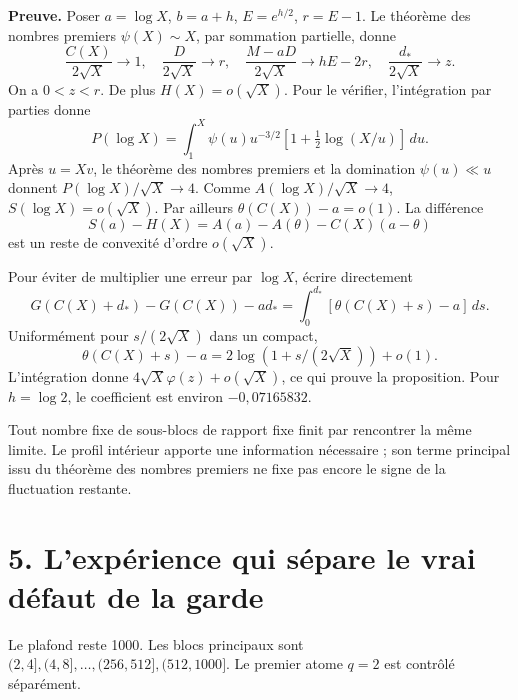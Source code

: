 \documentclass[
  11pt,
  a4paper,
]{article}
\begin{document}
\textbf{Preuve.} Poser \(a=\log X\), \(b=a+h\), \(E=e^{h/2}\),
\(r=E-1\). Le théorème des nombres premiers \(\psi(X)\sim X\), par
sommation partielle, donne \[
\frac{C(X)}{2\sqrt X}\to1,\quad
\frac{D}{2\sqrt X}\to r,\quad
\frac{M-aD}{2\sqrt X}\to hE-2r,\quad
\frac{d_*}{2\sqrt X}\to z.
\] On a \(0<z<r\). De plus \(H(X)=o(\sqrt X)\). Pour le vérifier,
l'intégration par parties donne \[
P(\log X)=\int_1^X\psi(u)u^{-3/2}
       [1+\tfrac12\log(X/u)]\,du.
\] Après \(u=Xv\), le théorème des nombres premiers et la domination
\(\psi(u)\ll u\) donnent \(P(\log X)/\sqrt X\to4\). Comme
\(A(\log X)/\sqrt X\to4\), \(S(\log X)=o(\sqrt X)\). Par ailleurs
\(\theta(C(X))-a=o(1)\). La différence \[
S(a)-H(X)=A(a)-A(\theta)-C(X)(a-\theta)
\] est un reste de convexité d'ordre \(o(\sqrt X)\).

Pour éviter de multiplier une erreur par \(\log X\), écrire directement
\[
G(C(X)+d_*)-G(C(X))-a d_*
=\int_0^{d_*}[\theta(C(X)+s)-a]\,ds.
\] Uniformément pour \(s/(2\sqrt X)\) dans un compact, \[
\theta(C(X)+s)-a=2\log(1+s/(2\sqrt X))+o(1).
\] L'intégration donne \(4\sqrt X\varphi(z)+o(\sqrt X)\), ce qui prouve
la proposition. Pour \(h=\log2\), le coefficient est environ
\(-0,07165832\).

Tout nombre fixe de sous-blocs de rapport fixe finit par rencontrer la
même limite. Le profil intérieur apporte une information nécessaire ;
son terme principal issu du théorème des nombres premiers ne fixe pas
encore le signe de la fluctuation restante.

\newpage

\hypertarget{lexpuxe9rience-qui-suxe9pare-le-vrai-duxe9faut-de-la-garde}{%
\section{5. L'expérience qui sépare le vrai défaut de la
garde}\label{lexpuxe9rience-qui-suxe9pare-le-vrai-duxe9faut-de-la-garde}}

Le plafond reste 1000. Les blocs principaux sont
\((2,4],(4,8],\ldots, (256,512],(512,1000]\). Le premier atome \(q=2\)
est contrôlé séparément.
\end{document}
